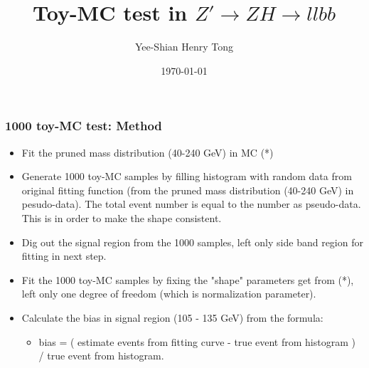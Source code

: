 \documentclass{beamer}
\title[]{Toy-MC test in $Z' \rightarrow ZH \rightarrow llbb$} %
\author[Henry Tong]{Yee-Shian Henry Tong} %
\institute[NCU]{ %
  National Central University \\ %
  \medskip
  \textit{Diboson Meeting} %
}
\date{\today} %
\begin{document}
\begin{frame}
  \vspace*{-1cm}
  \enlargethispage{1cm}
  \titlepage %
\end{frame}


\begin{frame}
  \frametitle{1000 toy-MC test: Method}
  \justifying
  \begin{footnotesize}
    \begin{itemize}
    \item Fit the pruned mass distribution (40-240 GeV) in MC (*)
    \item Generate 1000 toy-MC samples by filling histogram with random data from original fitting function (from the pruned mass distribution (40-240 GeV) in pesudo-data). The total event number is equal to the number as pseudo-data. This is in order to make the shape consistent.
    \item Dig out the signal region from the 1000 samples, left only side band region for fitting in next step.
    \item Fit the 1000 toy-MC samples by fixing the "shape" parameters get from (*), left only one degree of freedom (which is normalization parameter).
    \item Calculate the bias in signal region (105 - 135 GeV) from the formula:
      \begin{itemize}
      \item bias = ( estimate events from fitting curve - true event from histogram ) / true event from histogram.
      \end{itemize}
    \end{itemize}
  \end{footnotesize}
\end{frame}
\end{document}
